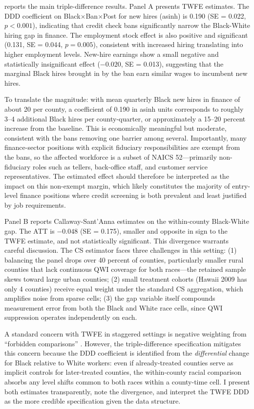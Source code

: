 \documentclass[12pt]{article}
\begin{document}
 reports the main triple-difference results. Panel A presents TWFE estimates. The DDD coefficient on Black$\times$Ban$\times$Post for new hires (asinh) is 0.190 (SE = 0.022, $p < 0.001$), indicating that credit check bans significantly narrow the Black-White hiring gap in finance. The employment stock effect is also positive and significant (0.131, SE = 0.044, $p = 0.005$), consistent with increased hiring translating into higher employment levels. New-hire earnings show a small negative and statistically insignificant effect ($-0.020$, SE = 0.013), suggesting that the marginal Black hires brought in by the ban earn similar wages to incumbent new hires.

To translate the magnitude: with mean quarterly Black new hires in finance of about 20 per county, a coefficient of 0.190 in asinh units corresponds to roughly 3--4 additional Black hires per county-quarter, or approximately a 15--20 percent increase from the baseline. This is economically meaningful but moderate, consistent with the bans removing one barrier among several. Importantly, many finance-sector positions with explicit fiduciary responsibilities are exempt from the bans, so the affected workforce is a subset of NAICS 52---primarily non-fiduciary roles such as tellers, back-office staff, and customer service representatives. The estimated effect should therefore be interpreted as the impact on this non-exempt margin, which likely constitutes the majority of entry-level finance positions where credit screening is both prevalent and least justified by job requirements.

Panel B reports Callaway-Sant'Anna estimates on the within-county Black-White gap. The ATT is $-0.048$ (SE = 0.175), smaller and opposite in sign to the TWFE estimate, and not statistically significant. This divergence warrants careful discussion. The CS estimator faces three challenges in this setting: (1) balancing the panel drops over 40 percent of counties, particularly smaller rural counties that lack continuous QWI coverage for both races---the retained sample skews toward large urban counties; (2) small treatment cohorts (Hawaii 2009 has only 4 counties) receive equal weight under the standard CS aggregation, which amplifies noise from sparse cells; (3) the gap variable itself compounds measurement error from both the Black and White race cells, since QWI suppression operates independently on each.

A standard concern with TWFE in staggered settings is negative weighting from ``forbidden comparisons'' \citep{goodmanbacon2021}. However, the triple-difference specification mitigates this concern because the DDD coefficient is identified from the \textit{differential} change for Black relative to White workers: even if already-treated counties serve as implicit controls for later-treated counties, the within-county racial comparison absorbs any level shifts common to both races within a county-time cell. I present both estimates transparently, note the divergence, and interpret the TWFE DDD as the more credible specification given the data structure.
\end{document}
